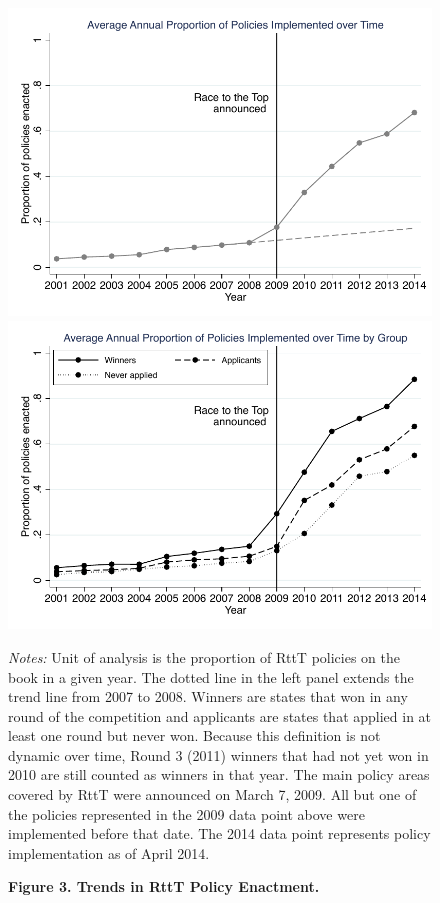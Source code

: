 \documentclass[12pt]{article}
\begin{document}
\begin{figure}[h!]
\begin{minipage}{.85\textwidth}
\end{minipage}
\end{figure}

\clearpage

\begin{figure}[h!]
\caption*{\bf Figure 3. Trends in RttT Policy Enactment.}
\begin{minipage}{.85\textwidth} 
\begin{center} 
    \includegraphics[width=.49\textwidth]{scatter_leghist_mean.pdf}
    \includegraphics[width=.49\textwidth]{scatter_leghist_mean_all.pdf}
\end{center}
{\footnotesize \textit{Notes:} Unit of analysis is the proportion of RttT policies on the book in a given year. The dotted line in the left panel extends the trend line from 2007 to 2008. Winners are states that won in any round of the competition and applicants are states that applied in at least one round but never won. Because this definition is not dynamic over time, Round 3 (2011) winners that had not yet won in 2010 are still counted as winners in that year. The main policy areas covered by RttT were announced on March 7, 2009. All but one of the policies represented in the 2009 data point above were implemented before that date. The 2014 data point represents policy implementation as of April 2014. \par}
\end{minipage}
\end{figure}

\clearpage
\end{document}

